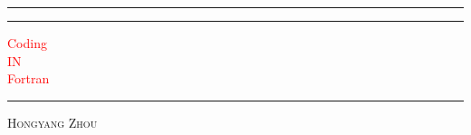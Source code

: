 \documentclass[11pt]{book} %
\newcommand{\plogo}{\fbox{$\mathcal{HY}$}} %
\begin{document}

\begin{titlepage} %
	
	\centering %
	
	
	\rule{\textwidth}{1pt} %
	
	\vspace{2pt}\vspace{-\baselineskip} %
	
	\rule{\textwidth}{0.4pt} %
	
	\vspace{0.1\textheight} %
	
	
	\textcolor{Red}{ %
		{\Huge Coding}\\[0.5\baselineskip] %
		{\Large IN}\\[0.5\baselineskip] %
		{\Huge Fortran} %
	}
	
	\vspace{0.025\textheight} %
	
	\rule{0.3\textwidth}{0.4pt} %
	
	\vspace{0.1\textheight} %
	
	
	{\Large \textsc{Hongyang Zhou}} %
	
	\vfill %
	
	
	{\large\textcolor{Red}{\plogo}}\\[0.5\baselineskip] %
	

\end{titlepage}
\end{document}
